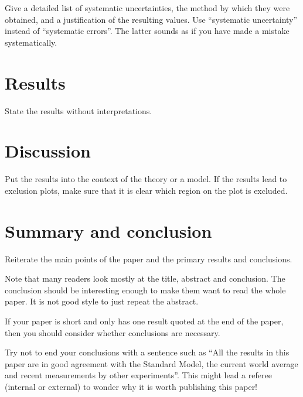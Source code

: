 \documentclass[11pt,a4paper]{atlasnote}
\begin{document}
Give a detailed list of systematic uncertainties, the method
by which they were obtained, and a justification of the resulting
values.
%
Use ``systematic uncertainty'' instead of ``systematic errors''.
The latter sounds as if you have made a mistake systematically.

%
%
\section{Results}

State the results without interpretations.

%
%
\section{Discussion}

Put the results into the context of the theory or a model.
%
If the results lead to exclusion plots, make sure that it is clear 
which region on the plot is excluded.

%
%
\section{Summary and conclusion}

Reiterate the main points of the paper and the primary results and
conclusions.

Note that many readers look mostly at the title, abstract and
conclusion. The conclusion should be interesting enough to
make them want to read the whole paper.
It is not good style to just repeat the abstract.

If your paper is short and only has one result quoted at the end of
the paper, then you should consider whether conclusions are
necessary. 

Try not to end your conclusions with a sentence such as
``All the results in this paper are in good agreement with the
Standard Model, the current world average and recent
measurements by other experiments''. This might lead a referee
(internal or external) to wonder why it is worth publishing this
paper!
\end{document}
